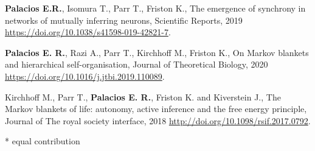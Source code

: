 \documentclass[11pt,usenames, dvipsnames]{article}
\begin{document}
{\bfseries Palacios E.R.}, Isomura T., Parr T., Friston K., The emergence of synchrony in networks of mutually inferring
        neurons, Scientific Reports, 2019 \url{https://doi.org/10.1038/s41598-019-42821-7}.
\vspace{7pt}

{\bfseries Palacios E. R.}, Razi A., Parr T., Kirchhoff M., Friston K., On Markov blankets and hierarchical self-organisation, Journal
        of Theoretical Biology, 2020 \url{https://doi.org/10.1016/j.jtbi.2019.110089}.
\vspace{7pt}

Kirchhoff M., Parr T., {\bfseries Palacios E. R.}, Friston K. and Kiverstein J., The Markov blankets of life: autonomy, active
        inference and the free energy principle, Journal of The royal society interface, 2018 \url{http://doi.org/10.1098/rsif.2017.0792}.
\vspace{1cm}

* equal contribution
\end{document}
